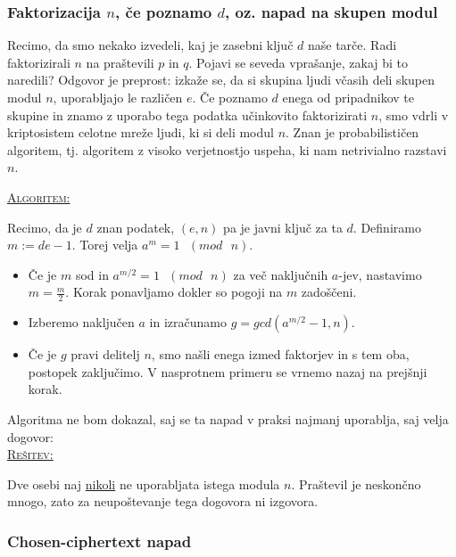 \documentclass[a4paper, 12pt]{article} %
\newenvironment{matematika}[1]{
\textcolor{bostonuniversityred}{\underline{\textsc{#1:}}}
}{
}
\begin{document}
\subsubsection{Faktorizacija $n$, če poznamo $d$, oz. napad na skupen modul}

Recimo, da smo nekako izvedeli, kaj je zasebni ključ $d$ naše tarče. Radi faktorizirali $n$ na praštevili $p$ in $q$. Pojavi se seveda vprašanje, zakaj bi to naredili? Odgovor je preprost: izkaže se, da si skupina ljudi včasih deli skupen modul $n$, uporabljajo le različen $e$. Če poznamo $d$ enega od pripadnikov te skupine in znamo z uporabo tega podatka učinkovito faktorizirati $n$, smo vdrli v kriptosistem celotne mreže ljudi, ki si deli modul $n$.
\newline
\newline
Znan je probabilističen algoritem, tj. algoritem z visoko verjetnostjo uspeha, ki nam netrivialno razstavi $n$.

\begin{matematika}{Algoritem}
Recimo, da je $d$ znan podatek, $(e, n)$ pa je javni ključ za ta $d$. Definiramo $m := de -1$. Torej velja $a^m = 1 \text{ } (mod \text{ } n)$.
\begin{itemize}[label=]
\item Če je $m$ sod in $a^{m/2} = 1 \text{ } (mod \text{ } n)$ za več naključnih $a$-jev, nastavimo $m = \frac{m}{2}$. Korak ponavljamo dokler so pogoji na $m$ zadoščeni.
\item Izberemo naključen $a$ in izračunamo $g = gcd(a^{m/2} - 1, n)$.
\item Če je $g$ pravi delitelj $n$, smo našli enega izmed faktorjev in s tem oba, postopek zaključimo. V nasprotnem primeru se vrnemo nazaj na prejšnji korak. \\
\end{itemize}
\end{matematika}

Algoritma ne bom dokazal, saj se ta napad v praksi najmanj uporablja, saj velja dogovor: \\
\begin{matematika}{Rešitev}
Dve osebi naj \underline{nikoli} ne uporabljata istega modula $n$. Praštevil je neskončno mnogo, zato za neupoštevanje tega dogovora ni izgovora.
\end{matematika}

\subsubsection{Chosen-ciphertext napad}
\end{document}
